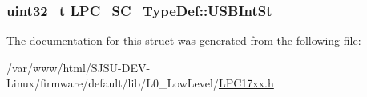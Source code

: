 \subsubsection[{\texorpdfstring{U\+S\+B\+Int\+St}{USBIntSt}}]{ uint32\+\_\+t L\+P\+C\+\_\+\+S\+C\+\_\+\+Type\+Def\+::\+U\+S\+B\+Int\+St}\hypertarget{structLPC__SC__TypeDef_a5590a260eb4d547a84c32498862c04b7}{}\label{structLPC__SC__TypeDef_a5590a260eb4d547a84c32498862c04b7}


The documentation for this struct was generated from the following file\+:\begin{DoxyCompactItemize}
\item 
/var/www/html/\+S\+J\+S\+U-\/\+D\+E\+V-\/\+Linux/firmware/default/lib/\+L0\+\_\+\+Low\+Level/\hyperlink{LPC17xx_8h}{L\+P\+C17xx.\+h}\end{DoxyCompactItemize}
